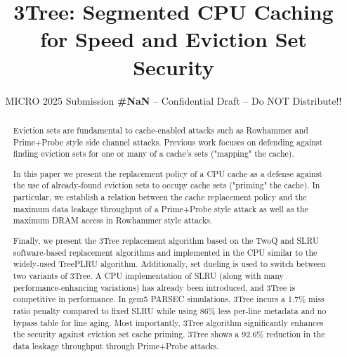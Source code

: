 \documentclass[sigconf, screen, review]{acmart}
\begin{document}
\title{3Tree: Segmented CPU Caching for Speed and Eviction Set
  Security}
\subtitle{\normalsize{MICRO 2025 Submission
    \textbf{\#NaN} -- Confidential Draft -- Do NOT Distribute!!}}




\begin{abstract}

  Eviction sets are fundamental to cache-enabled attacks such as Rowhammer
  and Prime+Probe style side channel attacks.
  Previous work focuses on defending against finding eviction sets for one or many
  of a cache's sets ("mapping" the cache).

  In this paper we present the replacement policy of a CPU cache as a defense against
  the use of already-found eviction sets to occupy cache sets ("priming" the cache).
  In particular, we establish a relation between the cache replacement policy and the
  maximum data leakage throughput of a Prime+Probe style attack as well as the
  maximum DRAM access in Rowhammer style attacks.

  Finally, we present the 3Tree replacement algorithm based on the TwoQ and SLRU
  software-based replacement algorithms and implemented in the CPU similar to the widely-used
  TreePLRU algorithm.
  Additionally, set dueling is used to switch between two variants of 3Tree.
  A CPU implementation of SLRU (along with many performance-enhancing variations) has
  already been introduced, and 3Tree is competitive in performance.
  In gem5 PARSEC simulations, 3Tree incurs a 1.7\% miss ratio penalty
  compared to fixed SLRU while using 86\% less per-line metadata and no bypass table for line aging.
  Most importantly, 3Tree algorithm significantly enhances the security against eviction set
  cache priming.
  3Tree shows a 92.6\% reduction in the data leakage throughput through Prime+Probe attacks.

\end{abstract}
\end{document}
